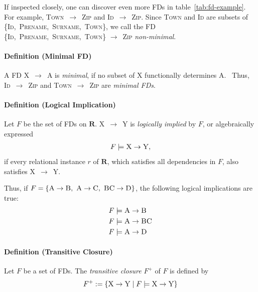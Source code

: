 If inspected closely, one can discover even more FDs in table~\ref{tab:fd-example}.
For example, \textsc{Town}~\( \rightarrow \)~\textsc{Zip} and \textsc{Id}~\( \rightarrow \)~\textsc{Zip}.
Since \textsc{Town} and \textsc{Id} are subsets of \{\textsc{Id},~\textsc{Prename},~\textsc{Surname},~\textsc{Town}\}, we call the FD \{\textsc{Id},~\textsc{Prename},~\textsc{Surname},~\textsc{Town}\} \( \rightarrow \)~\textsc{Zip} \emph{non-minimal}.

\paragraph{Definition (Minimal FD)} A FD X~\( \rightarrow \)~A is \emph{minimal}, if no subset of X functionally determines A.~\cite[p.~2]{PAP15}
Thus, \textsc{Id}~\( \rightarrow \)~\textsc{Zip} and \textsc{Town}~\( \rightarrow \)~\textsc{Zip} are \emph{minimal FDs}.

\paragraph{Definition (Logical Implication)} Let \( F \) be the set of FDs on \( \boldsymbol{R} \).
\textsc{X}~\( \rightarrow  \)~\textsc{Y} is \emph{logically implied} by \( F \), or algebraically expressed
\begin{align}
    F \models \textsc{X} \rightarrow \textsc{Y},
\end{align}
if every relational instance \( r \) of \( \boldsymbol{R} \), which satisfies all dependencies in \( F \), also satisfies \textsc{X}~\( \rightarrow \)~\textsc{Y}.~\cite[p.~166]{STU16}

Thus, if \( F = \{ \textsc{A} \rightarrow \textsc{B},~\textsc{A} \rightarrow \textsc{C},~\textsc{BC} \rightarrow \textsc{D} \} \), the following logical implications are true:
\begin{align*}
    &F \models \textsc{A} \rightarrow \textsc{B} \\
    &F \models \textsc{A} \rightarrow \textsc{BC} \\
    &F \models \textsc{A} \rightarrow \textsc{D}
\end{align*}

\paragraph{Definition (Transitive Closure)} Let \( F \) be a set of FDs.
The \emph{transitive closure} \( F^{+} \) of \( F \) is defined by
\begin{align}\label{eq:transitive-closure}
    F^{+} := \{ \textsc{X} \rightarrow \textsc{Y} \mid F \models \textsc{X} \rightarrow \textsc{Y} \}
\end{align}

